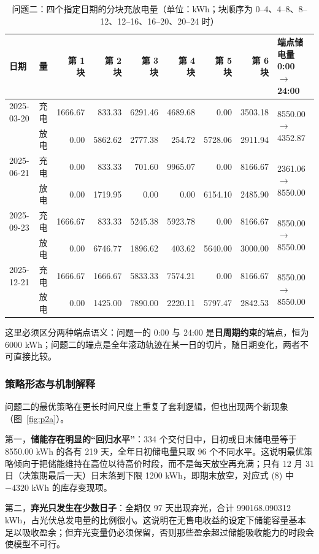 \begin{table}[htbp]
\centering
\footnotesize
\caption{问题二：四个指定日期的分块充放电量（单位：kWh；块顺序为 0--4、4--8、8--12、12--16、16--20、20--24 时）}
\label{tab:p2b}
\begin{tabular}{llrrrrrrl}
\toprule
日期 & 量 & 第 1 块 & 第 2 块 & 第 3 块 & 第 4 块 & 第 5 块 & 第 6 块 & 端点储电量 0:00 $\to$ 24:00 \\
\midrule
2025-03-20 & 充电 & 1666.67 & 833.33 & 6291.46 & 4689.68 & 0.00 & 3503.18 & \multirow{2}{*}{8550.00 $\to$ 4352.87} \\
 & 放电 & 0.00 & 5862.62 & 2777.38 & 254.72 & 5728.06 & 2911.94 & \\
2025-06-21 & 充电 & 0.00 & 833.33 & 701.60 & 9965.07 & 0.00 & 8166.67 & \multirow{2}{*}{2361.06 $\to$ 8550.00} \\
 & 放电 & 0.00 & 1719.95 & 0.00 & 0.00 & 6154.10 & 2485.90 & \\
2025-09-23 & 充电 & 1666.67 & 833.33 & 5245.38 & 5923.78 & 0.00 & 8166.67 & \multirow{2}{*}{8550.00 $\to$ 8550.00} \\
 & 放电 & 0.00 & 6746.77 & 1896.62 & 403.62 & 5640.00 & 3000.00 & \\
2025-12-21 & 充电 & 1666.67 & 1666.67 & 5833.33 & 7574.21 & 0.00 & 8166.67 & \multirow{2}{*}{8550.00 $\to$ 8550.00} \\
 & 放电 & 0.00 & 1425.00 & 7890.00 & 2220.11 & 5797.47 & 2842.53 & \\
\bottomrule
\end{tabular}
\end{table}

这里必须区分两种端点语义：问题一的 0:00 与 24:00 是\textbf{日周期约束}的端点，恒为 6000 kWh；问题二的端点是全年滚动轨迹在某一日的切片，随日期变化，两者不可直接比较。

\subsubsection{策略形态与机制解释}

问题二的最优策略在更长时间尺度上重复了套利逻辑，但也出现两个新现象（图~\ref{fig:p2a}）。

第一，\textbf{储能存在明显的“回归水平”}：334 个交付日中，日初或日末储电量等于 8550.00 kWh 的各有 219 天，全年日初储电量只取 96 个不同水平。这说明最优策略倾向于把储能维持在高位以待高价时段，而不是每天放空再充满；只有 12 月 31 日（决策期最后一天）日末落到下限 1200 kWh，即期末放空，对应式 (8) 中 $-4320$ kWh 的库存变现项。

第二，\textbf{弃光只发生在少数日子}：全期仅 97 天出现弃光，合计 990168.090312 kWh，占光伏总发电量的比例很小。这说明在无售电收益的设定下储能容量基本足以吸收盈余；但弃光变量仍必须保留，否则那些盈余超过储能吸收能力的时段会使模型不可行。

